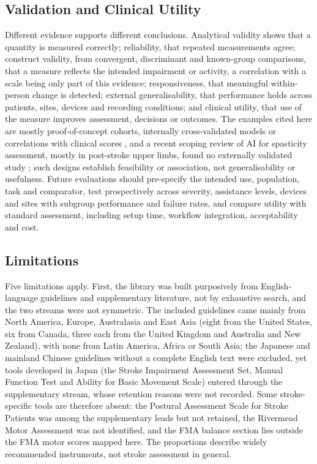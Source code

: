 \documentclass[11pt]{article}
\begin{document}
\subsection{Validation and Clinical Utility}
\label{sec:validation}

Different evidence supports different conclusions. Analytical validity shows that a quantity is measured correctly; reliability, that repeated measurements agree; construct validity, from convergent, discriminant and known-group comparisons, that a measure reflects the intended impairment or activity, a correlation with a scale being only part of this evidence; responsiveness, that meaningful within-person change is detected; external generalisability, that performance holds across patients, sites, devices and recording conditions; and clinical utility, that use of the measure improves assessment, decisions or outcomes. The examples cited here are mostly proof-of-concept cohorts, internally cross-validated models or correlations with clinical scores \cite{S3Lonini202235224426,Lee2021SmartphoneVideoAmbulation,Proffitt2023DepthMovement,Grimm2021KinematicValidation}, and a recent scoping review of AI for spasticity assessment, mostly in post-stroke upper limbs, found no externally validated study \cite{Cao2026AISpasticity}; such designs establish feasibility or association, not generalisability or usefulness. Future evaluations should pre-specify the intended use, population, task and comparator, test prospectively across severity, assistance levels, devices and sites with subgroup performance and failure rates, and compare utility with standard assessment, including setup time, workflow integration, acceptability and cost.

\subsection{Limitations}
\label{sec:limitations}

Five limitations apply. First, the library was built purposively from English-language guidelines and supplementary literature, not by exhaustive search, and the two streams were not symmetric. The included guidelines came mainly from North America, Europe, Australasia and East Asia (eight from the United States, six from Canada, three each from the United Kingdom and Australia and New Zealand), with none from Latin America, Africa or South Asia; the Japanese and mainland Chinese guidelines without a complete English text were excluded, yet tools developed in Japan (the Stroke Impairment Assessment Set, Manual Function Test and Ability for Basic Movement Scale) entered through the supplementary stream, whose retention reasons were not recorded. Some stroke-specific tools are therefore absent: the Postural Assessment Scale for Stroke Patients was among the supplementary leads but not retained, the Rivermead Motor Assessment was not identified, and the FMA balance section lies outside the FMA motor scores mapped here. The proportions describe widely recommended instruments, not stroke assessment in general.
\end{document}
